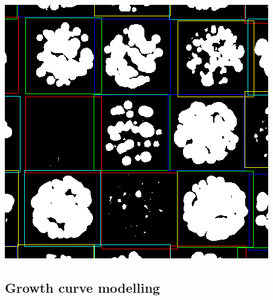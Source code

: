 \documentclass[mathserif,handout]{beamer}
\begin{document}
{\includegraphics[height=0.38\textheight]{figs/rod-plate-grid-thresh-zoom}

}


\subsection{Growth curve modelling}

\end{document}
